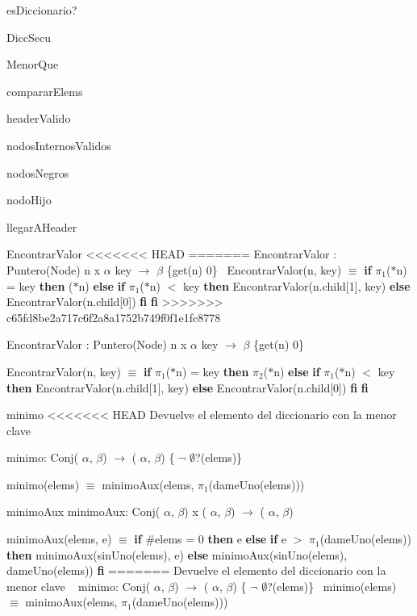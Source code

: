 \begin{DoxyParagraph}{es\-Diccionario?}
\begin{DoxyParagraph}{\-Dicc\-Secu}
\begin{DoxyParagraph}{\-Menor\-Que}
\begin{DoxyParagraph}{comparar\-Elems}
\begin{DoxyParagraph}{header\-Valido}
\begin{DoxyParagraph}{nodos\-Internos\-Validos}
\begin{DoxyParagraph}{nodos\-Negros}
\begin{DoxyParagraph}{nodo\-Hijo}
\begin{DoxyParagraph}{llegar\-A\-Header}
\begin{DoxyParagraph}{\-Encontrar\-Valor}
<<<<<<< HEAD
=======
Encontrar\+Valor \+: Puntero(\+Node) n x $\alpha$ key $\to$ $\beta$ \{get(n)  0\}~\newline
Encontrar\+Valor(n, key) $\equiv$ {\bfseries if} $\pi_1$($\ast$n) = key {\bfseries then} ($\ast$n) {\bfseries else} {\bfseries if} $\pi_1$($\ast$n) $<$ key {\bfseries then} Encontrar\+Valor(n.\+child\mbox{[}1\mbox{]}, key) {\bfseries else} Encontrar\+Valor(n.\+child\mbox{[}0\mbox{]}) {\bfseries fi} {\bfseries fi} 
>>>>>>> c65fd8be2a717c6f2a8a1752b749f0f1e1fc8778
\end{DoxyParagraph}
\-Encontrar\-Valor \-: \-Puntero(\-Node) n x $\alpha$ key $\to$ $\beta$ \{get(n)  0\}\par
 \-Encontrar\-Valor(n, key) $\equiv$ {\bfseries if} $\pi_1$($\ast$n) = key {\bfseries then} $\pi_2$($\ast$n) {\bfseries else} {\bfseries if} $\pi_1$($\ast$n) $<$ key {\bfseries then} \-Encontrar\-Valor(n.\-child\mbox{[}1\mbox{]}, key) {\bfseries else} \-Encontrar\-Valor(n.\-child\mbox{[}0\mbox{]}) {\bfseries fi} {\bfseries fi} 

\begin{DoxyParagraph}{minimo}
<<<<<<< HEAD
\-Devuelve el elemento del diccionario con la menor clave \par
 minimo\-: \-Conj( $\alpha$, $\beta$) $\to$ ( $\alpha$, $\beta$) \{ $\lnot$ $\emptyset$?(elems)\}\par
 minimo(elems) $\equiv$ minimo\-Aux(elems, $\pi_1$(dame\-Uno(elems))) 
\end{DoxyParagraph}
\begin{DoxyParagraph}{minimo\-Aux}
minimo\-Aux\-: \-Conj( $\alpha$, $\beta$) x ( $\alpha$, $\beta$) $\to$ ( $\alpha$, $\beta$)\par
 minimo\-Aux(elems, e) $\equiv$ {\bfseries if} \#elems = 0 {\bfseries then} e {\bfseries else} {\bfseries if} e $>$ $\pi_1$(dame\-Uno(elems)) {\bfseries then} minimo\-Aux(sin\-Uno(elems), e) {\bfseries else} minimo\-Aux(sin\-Uno(elems), dame\-Uno(elems)) {\bfseries fi} 
=======
Devuelve el elemento del diccionario con la menor clave ~\newline
minimo\+: Conj( $\alpha$, $\beta$) $\to$ ( $\alpha$, $\beta$) \{ $\lnot$ $\emptyset$?(elems)\}~\newline
minimo(elems) $\equiv$ minimo\+Aux(elems, $\pi_1$(dame\+Uno(elems))) 
\end{DoxyParagraph}



\end{DoxyParagraph}
\end{DoxyParagraph}
\end{DoxyParagraph}
\end{DoxyParagraph}
\end{DoxyParagraph}
\end{DoxyParagraph}
\end{DoxyParagraph}
\end{DoxyParagraph}
\end{DoxyParagraph}
